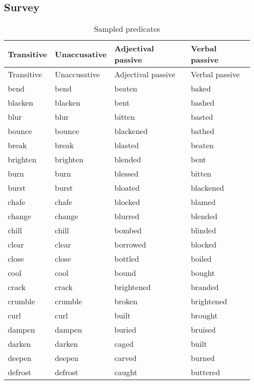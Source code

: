 \documentclass[output=paper]{langsci/langscibook}
\begin{document}
\begin{paperappendix}
\section{Survey}\label{app-14:a}
\largerpage
{\small
\begin{longtable}{ *{4}{>{\raggedright\arraybackslash}p{}} }
\caption{Sampled predicates}\\
\lsptoprule Transitive  & Unaccusative & Adjectival passive & Verbal passive\\\midrule\endfirsthead
\midrule Transitive  & Unaccusative & Adjectival passive & Verbal passive\\\midrule\endhead
\endfoot\lspbottomrule\endlastfoot
bend      & bend      & beaten     & baked\\
blacken   & blacken   & bent       & bashed\\
blur      & blur      & bitten     & basted\\
bounce    & bounce    & blackened  & bathed\\
break     & break     & blasted    & beaten\\
brighten  & brighten  & blended    & bent\\
burn      & burn      & blessed    & bitten \\
burst     & burst     & bloated    & blackened\\
chafe     & chafe     & blocked    & blamed\\
change    & change    & blurred    & blended\\
chill     & chill     & bombed     & blinded\\
clear     & clear     & borrowed   & blocked\\
close     & close     & bottled    & boiled\\
cool      & cool      & bound      & bought\\
crack     & crack     & brightened & branded\\
crumble   & crumble   & broken     & brightened\\
curl      & curl      & built      & brought\\
dampen    & dampen    & buried     & bruised\\
darken    & darken    & caged      & built \\
deepen    & deepen    & carved     & burned\\
defrost   & defrost   & caught     & buttered\\

\end{longtable}}
\end{paperappendix}
\end{document}
